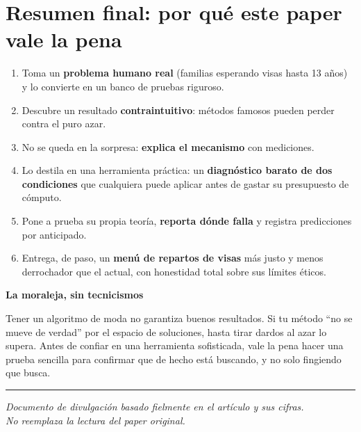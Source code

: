 \documentclass[11pt]{article}
\newcommand{\cajacolor}{cajadato}
\newenvironment{caja}[2]{%
  \par\medskip\noindent
  \renewcommand{\cajacolor}{#1}%
  \begin{lrbox}{\cajabox}%
  \begin{minipage}{\dimexpr\linewidth-2\fboxsep-1.2em\relax}%
  \setlength{\parskip}{0.5em}%
  {\bfseries\color{acento2}#2}\par\smallskip}
  {\end{minipage}%
  \end{lrbox}%
  \setlength{\fboxsep}{0.6em}%
  \colorbox{\cajacolor}{\usebox{\cajabox}}\par\medskip}
\begin{document}
\section{Resumen final: por qué este paper vale la pena}

\begin{enumerate}[leftmargin=1.6em]
  \item Toma un \textbf{problema humano real} (familias esperando visas hasta 13 años) y lo convierte en un banco de pruebas riguroso.
  \item Descubre un resultado \textbf{contraintuitivo}: métodos famosos pueden perder contra el puro azar.
  \item No se queda en la sorpresa: \textbf{explica el mecanismo} con mediciones.
  \item Lo destila en una herramienta práctica: un \textbf{diagnóstico barato de dos condiciones} que cualquiera puede aplicar antes de gastar su presupuesto de cómputo.
  \item Pone a prueba su propia teoría, \textbf{reporta dónde falla} y registra predicciones por anticipado.
  \item Entrega, de paso, un \textbf{menú de repartos de visas} más justo y menos derrochador que el actual, con honestidad total sobre sus límites éticos.
\end{enumerate}

\begin{caja}{cajaclave}{La moraleja, sin tecnicismos}
Tener un algoritmo de moda no garantiza buenos resultados. Si tu método ``no se mueve de verdad'' por el espacio de soluciones, hasta tirar dardos al azar lo supera. Antes de confiar en una herramienta sofisticada, vale la pena hacer una prueba sencilla para confirmar que de hecho está buscando, y no solo fingiendo que busca.
\end{caja}

\vfill
\noindent\textcolor{regla}{\rule{\linewidth}{0.8pt}}
\begin{center}
\small\itshape Documento de divulgación basado fielmente en el artículo y sus cifras.\\ No reemplaza la lectura del paper original.
\end{center}
\end{document}
